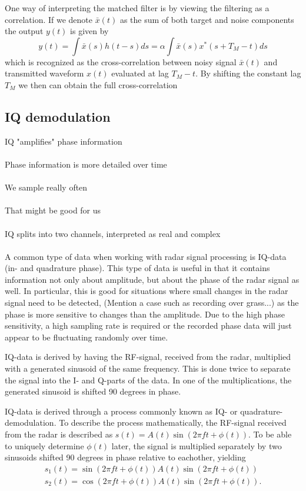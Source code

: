 \documentclass[a4paper, 12pt]{article}
\begin{document}
One way of interpreting the matched filter is by viewing the filtering as a correlation. If we denote $\bar{x}(t)$ as the sum of both target and noise components the output $y(t)$ is given by
%
\begin{equation}
	y(t) = \int \bar{x}(s)h(t-s)ds = \alpha\int \bar{x}(s)x^*(s + T_M - t)ds
\end{equation}
%
which is recognized as the cross-correlation between noisy signal $\bar	{x}(t)$ and transmitted waveform $x(t)$ evaluated at lag $T_M-t$. By shifting the constant lag $T_M$ we then can obtain the full cross-correlation 

\subsection{IQ demodulation}

IQ "amplifies" phase information
\\ \\
Phase information is more detailed over time
\\  \\
We sample really often
\\ \\
That might be good for us
\\ \\
IQ splits into two channels, interpreted as real and complex
\\ \\





A common type of data when working with radar signal processing is IQ-data (in- and quadrature phase).  This type of data is useful in that it contains information not only about amplitude, but about the phase of the radar signal as well. In particular, this is good for situations where small changes in the radar signal need to be detected, (Mention a case such as recording over grass...) as the phase is more sensitive to changes than the amplitude. Due to the high phase sensitivity, a high sampling rate is required or the recorded phase data will just appear to be fluctuating randomly over time.

IQ-data is derived by having the RF-signal, received from the radar, multiplied with a generated sinusoid of the same frequency. This is done twice to separate the signal into the I- and Q-parts of the data. In one of the multiplications, the generated sinusoid is shifted 90 degrees in phase. 

IQ-data is derived through a process commonly known as IQ- or quadrature-demodulation. To describe the process mathematically,  the RF-signal received from the radar is described as $s(t) = A(t)\sin(2\pi ft+\phi(t))$. To be able to uniquely determine $\phi(t)$ later, the signal is multiplied separately by two sinusoids shifted 90 degrees in phase relative to eachother, yielding
\begin{gather}
	s_1(t) = \sin(2\pi ft+\phi(t))A(t)\sin(2\pi ft+\phi(t)) \\
	s_2(t) = \cos(2\pi ft+\phi(t))A(t)\sin(2\pi ft+\phi(t)).
\end{gather}
\end{document}
